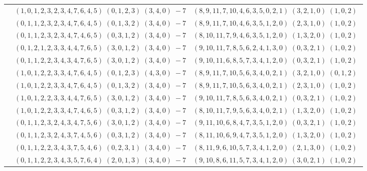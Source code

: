 \documentclass[11pt]{article}
\begin{document}
\begin{longtable}[l]{|c|c|c|}
 \cline{2-3} 
 & $(1 ,0 ,1 ,2 ,3 ,2 ,3 ,4 ,7 ,6 ,4 ,5) \;(0 ,1 ,2 ,3) \;(3 ,4 ,0) \;-7$ & $(8 ,9 ,11 ,7 ,10 ,4 ,6 ,3 ,5 ,0 ,2 ,1) \;(3 ,2 ,1 ,0) \;(1 ,0 ,2) \;$\\ 
 \cline{2-3} 
 & $(0 ,1 ,1 ,2 ,3 ,2 ,3 ,4 ,7 ,6 ,4 ,5) \;(0 ,1 ,3 ,2) \;(3 ,4 ,0) \;-7$ & $(8 ,9 ,11 ,7 ,10 ,4 ,6 ,3 ,5 ,1 ,2 ,0) \;(2 ,3 ,1 ,0) \;(1 ,0 ,2) \;$\\ 
 \cline{2-3} 
 & $(0 ,1 ,1 ,2 ,3 ,2 ,3 ,4 ,7 ,4 ,6 ,5) \;(0 ,3 ,1 ,2) \;(3 ,4 ,0) \;-7$ & $(8 ,10 ,11 ,7 ,9 ,4 ,6 ,3 ,5 ,1 ,2 ,0) \;(1 ,3 ,2 ,0) \;(1 ,0 ,2) \;$\\ 
 \cline{2-3} 
 & $(0 ,1 ,2 ,1 ,2 ,3 ,3 ,4 ,4 ,7 ,6 ,5) \;(3 ,0 ,1 ,2) \;(3 ,4 ,0) \;-7$ & $(9 ,10 ,11 ,7 ,8 ,5 ,6 ,2 ,4 ,1 ,3 ,0) \;(0 ,3 ,2 ,1) \;(1 ,0 ,2) \;$\\ 
 \cline{2-3} 
 & $(0 ,1 ,1 ,2 ,2 ,3 ,4 ,3 ,4 ,7 ,6 ,5) \;(3 ,0 ,1 ,2) \;(3 ,4 ,0) \;-7$ & $(9 ,10 ,11 ,6 ,8 ,5 ,7 ,3 ,4 ,1 ,2 ,0) \;(0 ,3 ,2 ,1) \;(1 ,0 ,2) \;$\\ 
 \cline{2-3} 
 & $(1 ,0 ,1 ,2 ,2 ,3 ,3 ,4 ,7 ,6 ,4 ,5) \;(0 ,1 ,2 ,3) \;(4 ,3 ,0) \;-7$ & $(8 ,9 ,11 ,7 ,10 ,5 ,6 ,3 ,4 ,0 ,2 ,1) \;(3 ,2 ,1 ,0) \;(0 ,1 ,2) \;$\\ 
 \cline{2-3} 
 & $(1 ,0 ,1 ,2 ,2 ,3 ,3 ,4 ,7 ,6 ,4 ,5) \;(0 ,1 ,3 ,2) \;(3 ,4 ,0) \;-7$ & $(8 ,9 ,11 ,7 ,10 ,5 ,6 ,3 ,4 ,0 ,2 ,1) \;(2 ,3 ,1 ,0) \;(1 ,0 ,2) \;$\\ 
 \cline{2-3} 
 & $(1 ,0 ,1 ,2 ,2 ,3 ,3 ,4 ,4 ,7 ,6 ,5) \;(3 ,0 ,1 ,2) \;(3 ,4 ,0) \;-7$ & $(9 ,10 ,11 ,7 ,8 ,5 ,6 ,3 ,4 ,0 ,2 ,1) \;(0 ,3 ,2 ,1) \;(1 ,0 ,2) \;$\\ 
 \cline{2-3} 
 & $(1 ,0 ,1 ,2 ,2 ,3 ,3 ,4 ,7 ,4 ,6 ,5) \;(0 ,3 ,1 ,2) \;(3 ,4 ,0) \;-7$ & $(8 ,10 ,11 ,7 ,9 ,5 ,6 ,3 ,4 ,0 ,2 ,1) \;(1 ,3 ,2 ,0) \;(1 ,0 ,2) \;$\\ 
 \cline{2-3} 
 & $(0 ,1 ,1 ,2 ,3 ,2 ,4 ,3 ,4 ,7 ,5 ,6) \;(3 ,0 ,1 ,2) \;(3 ,4 ,0) \;-7$ & $(9 ,11 ,10 ,6 ,8 ,4 ,7 ,3 ,5 ,1 ,2 ,0) \;(0 ,3 ,2 ,1) \;(1 ,0 ,2) \;$\\ 
 \cline{2-3} 
 & $(0 ,1 ,1 ,2 ,3 ,2 ,4 ,3 ,7 ,4 ,5 ,6) \;(0 ,3 ,1 ,2) \;(3 ,4 ,0) \;-7$ & $(8 ,11 ,10 ,6 ,9 ,4 ,7 ,3 ,5 ,1 ,2 ,0) \;(1 ,3 ,2 ,0) \;(1 ,0 ,2) \;$\\ 
 \cline{2-3} 
 & $(0 ,1 ,1 ,2 ,2 ,3 ,4 ,3 ,7 ,5 ,4 ,6) \;(0 ,2 ,3 ,1) \;(3 ,4 ,0) \;-7$ & $(8 ,11 ,9 ,6 ,10 ,5 ,7 ,3 ,4 ,1 ,2 ,0) \;(2 ,1 ,3 ,0) \;(1 ,0 ,2) \;$\\ 
 \cline{2-3} 
 & $(0 ,1 ,1 ,2 ,2 ,3 ,4 ,3 ,5 ,7 ,6 ,4) \;(2 ,0 ,1 ,3) \;(3 ,4 ,0) \;-7$ & $(9 ,10 ,8 ,6 ,11 ,5 ,7 ,3 ,4 ,1 ,2 ,0) \;(3 ,0 ,2 ,1) \;(1 ,0 ,2) \;$\\ 

\end{longtable}
\end{document}
